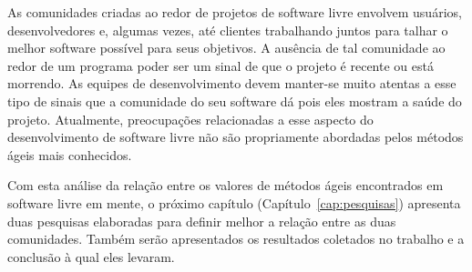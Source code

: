 As comunidades criadas ao redor de projetos de software livre envolvem
usuários, desenvolvedores e, algumas vezes, até clientes trabalhando
juntos para talhar o melhor software possível para seus objetivos. A
ausência de tal comunidade ao redor de um programa poder ser um sinal
de que o projeto é recente ou está morrendo. As equipes de
desenvolvimento devem manter-se muito atentas a esse tipo de sinais
que a comunidade do seu software dá pois eles mostram a saúde do
projeto. Atualmente, preocupações relacionadas a esse aspecto do
desenvolvimento de software livre não são propriamente abordadas pelos
métodos ágeis mais conhecidos.

Com esta análise da relação entre os valores de métodos ágeis
encontrados em software livre em mente, o próximo capítulo
(Capítulo~\ref{cap:pesquisas}) apresenta duas pesquisas elaboradas
para definir melhor a relação entre as duas comunidades. Também serão
apresentados os resultados coletados no trabalho e a conclusão à qual
eles levaram.
